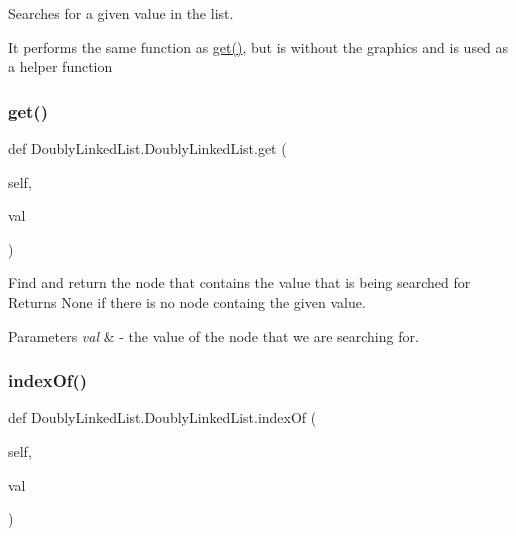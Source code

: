 Searches for a given value in the list. 

It performs the same function as \hyperlink{class_doubly_linked_list_1_1_doubly_linked_list_ae379d989c37b1e2fbed7b6bf6d14b780}{get()}, but is without the graphics and is used as a helper function \mbox{\label{class_doubly_linked_list_1_1_doubly_linked_list_ae379d989c37b1e2fbed7b6bf6d14b780}} 
\subsubsection{\texorpdfstring{get()}{get()}}
{\footnotesize\ttfamily def Doubly\+Linked\+List.\+Doubly\+Linked\+List.\+get (\begin{DoxyParamCaption}\item[{}]{self,  }\item[{}]{val }\end{DoxyParamCaption})}



Find and return the node that contains the value that is being searched for Returns None if there is no node containg the given value. 


\begin{DoxyParams}{Parameters}
{\em val} & -\/ the value of the node that we are searching for. \\
\hline
\end{DoxyParams}
\mbox{\label{class_doubly_linked_list_1_1_doubly_linked_list_aea5b7935cef243763de6c35417234ef2}} 
\subsubsection{\texorpdfstring{index\+Of()}{indexOf()}}
{\footnotesize\ttfamily def Doubly\+Linked\+List.\+Doubly\+Linked\+List.\+index\+Of (\begin{DoxyParamCaption}\item[{}]{self,  }\item[{}]{val }\end{DoxyParamCaption})}



